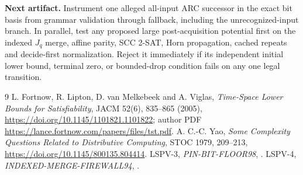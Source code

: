 \documentclass[11pt]{article}
\begin{document}
\textbf{Next artifact.}  Instrument one alleged all-input ARC successor in
the exact bit basis from grammar validation through fallback, including the
unrecognized-input branch.  In parallel, test any proposed large
post-acquisition potential first on the indexed $J_q$ merge, affine parity,
SCC 2-SAT, Horn propagation, cached repeats and decide-first normalization.
Reject it immediately if its independent initial lower bound, terminal zero,
or bounded-drop condition fails on any one legal transition.

\begin{thebibliography}{9}
 L. Fortnow, R. Lipton, D. van Melkebeek and A. Viglas,
\emph{Time-Space Lower Bounds for Satisfiability}, JACM 52(6), 835--865
(2005), \url{https://doi.org/10.1145/1101821.1101822}; author PDF
\url{https://lance.fortnow.com/papers/files/tst.pdf}.
 A. C.-C. Yao, \emph{Some Complexity Questions Related to
Distributive Computing}, STOC 1979, 209--213,
\url{https://doi.org/10.1145/800135.804414}.
 LSPV-3, \emph{PIN-BIT-FLOOR98},
.
 LSPV-4, \emph{INDEXED-MERGE-FIREWALL94},
.
\end{thebibliography}
\end{document}

